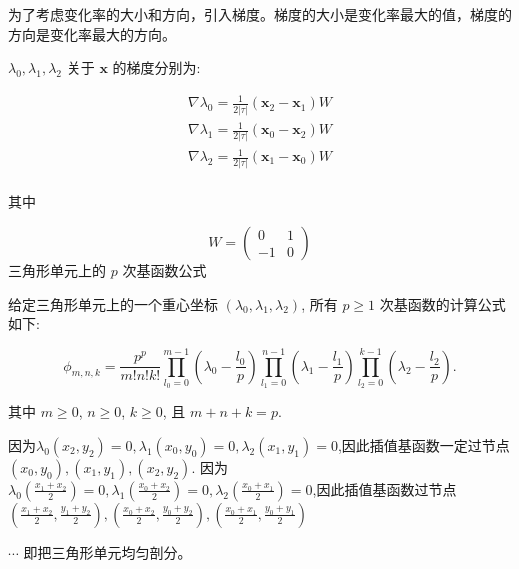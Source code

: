 \documentclass[12pt,a4paper]{article}
\begin{document}
为了考虑变化率的大小和方向，引入梯度。梯度的大小是变化率最大的值，梯度的方向是变化率最大的方向。

$\lambda_0, \lambda_1, \lambda_2$ 关于 $\mathbf x$ 的梯度分别为:

$$
\begin{aligned}
\nabla\lambda_0 = \frac{1}{2|\tau|}(\mathbf x_2 - \mathbf x_1)W\\
\nabla\lambda_1 = \frac{1}{2|\tau|}(\mathbf x_0 - \mathbf x_2)W\\
\nabla\lambda_2 = \frac{1}{2|\tau|}(\mathbf x_1 - \mathbf x_0)W\\
\end{aligned}
$$

其中 

$$
W = \begin{pmatrix}
0 & 1\\ -1 & 0 
\end{pmatrix}
$$
三角形单元上的 $p$ 次基函数公式

给定三角形单元上的一个重心坐标 $(\lambda_0, \lambda_1, \lambda_2)$, 所有 $p\geq 1$ 次基函数的计算公式如下:

$$
\phi_{m,n,k} = \frac{p^p}{m!n!k!}\prod_{l_0 = 0}^{m - 1}
(\lambda_0 - \frac{l_0}{p}) \prod_{l_1 = 0}^{n-1}(\lambda_1 -
\frac{l_1}{p}) \prod_{l_2=0}^{k-1}(\lambda_2 - \frac{l_2}{p}).
$$

其中 $ m\geq 0$, $n\geq 0$, $ k \geq 0$, 且 $m+n+k=p$.

因为$\lambda_0 (x_2,y_2) = 0,\lambda_1 (x_0,y_0) = 0,\lambda_2 (x_1,y_1) = 0$,因此插值基函数一定过节点$(x_0,y_0),(x_1,y_1),(x_2,y_2).$
因为$\lambda_0 (\frac{x_1+x_2}{2}) = 0,\lambda_1 (\frac{x_0+x_2}{2}) = 0,\lambda_2 (\frac{x_0+x_1}{2}) = 0$,因此插值基函数过节点$(\frac{x_1+x_2}{2},\frac{y_1+y_2}{2}),(\frac{x_0+x_2}{2},\frac{y_0+y_2}{2}),(\frac{x_0+x_1}{2},\frac{y_0+y_1}{2})$

$\cdots$
即把三角形单元均匀剖分。







%

\cite{tam19912d}

\end{document}
